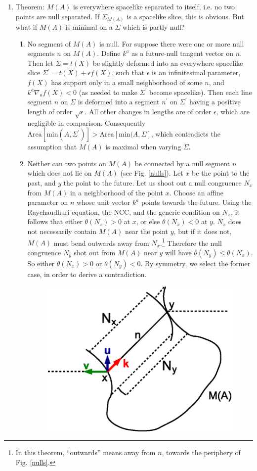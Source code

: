 \documentclass{article}
\begin{document}
\begin{enumerate}[resume]
\item \label{notnull} Theorem: $M(A)$ is everywhere spacelike separated to itself, i.e. no two points are null separated.  If $\Sigma_{M(A)}$ is a spacelike slice, this is obvious.  But what if $M(A)$ is minimal on a $\Sigma$ which is partly null?
	\begin{enumerate}
	\item \label{segnull} No segment of $M(A)$ is null.  For suppose there were one or more null segments $n$ on $M(A)$.  Define $k^a$ as a future-null tangent vector on $n$.  Then let $\Sigma = t(X)$ be slightly deformed into an everywhere spacelike slice $\Sigma^\prime = t(X) + \epsilon f(X)$, such that $\epsilon$ is an infinitesimal parameter, $f(X)$ has support only in a small neighborhood of some $n$, and $k^a \nabla_a f(X) < 0$ (as needed to make $\Sigma^\prime$ become spacelike).  Then each line segment $n$ on $\Sigma$ is deformed into a segment $n^\prime$ on $\Sigma^\prime$ having a positive length of order $\sqrt{\epsilon}$.  All other changes in lengths are of order $\epsilon$, which are negligible in comparison.  Consequently $\mathrm{Area}[\mathrm{min}(A,\Sigma^\prime)] > \mathrm{Area}[\mathrm{min}(A,\Sigma]$,
which contradicts the assumption that $M(A)$ is maximal when varying $\Sigma$.
	\item Neither can two points on $M(A)$ be connected by a null segment $n$ which does not lie on $M(A)$ (see Fig. \ref{nulls}).   Let $x$ be the point to the past, and $y$ the point to the future.  Let us shoot out a null congruence $N_x$ from $M(A)$ in a neighborhood of the point $x$.   Choose an affine parameter on $n$ whose unit vector $k^a$ points towards the future.  Using the Raychaudhuri equation, the NCC, and the generic condition on $N_x$, it follows that either $\theta(N_x) > 0$ at $x$, or else $\theta(N_x) < 0$ at $y$.  $N_x$ does not necessarily contain $M(A)$ near the point $y$, but if it does not, $M(A)$ must bend outwards away from $N_x$.\footnote{In this theorem, ``outwards'' means away from $n$, towards the periphery of Fig. \ref{nulls}.}  Therefore the null congruence $N_y$ shot out from $M(A)$ near $y$ will have $\theta(N_y) \le \theta(N_x)$.  So either $\theta(N_x) > 0$ or $\theta(N_y) < 0$.  By symmetry, we select the former case, in order to derive a contradiction.
\begin{figure}[hbt]
\centering
\includegraphics[width=.5\textwidth]{nulls.eps}

\end{figure}
\end{enumerate}
\end{enumerate}
\end{document}
